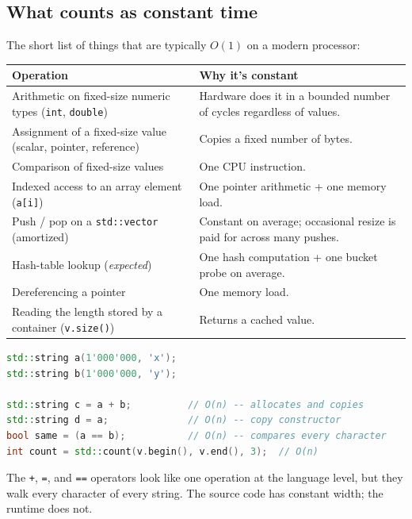 \documentclass[11pt]{article}
\begin{document}
\subsection{What counts as constant time}

The short list of things that are typically $O(1)$ on a modern
processor:

\begin{center}
\footnotesize
\renewcommand{\arraystretch}{1.3}
\begin{tabular}{@{}p{6cm}p{6.8cm}@{}}
\hline
\textbf{Operation} & \textbf{Why it's constant} \\
\hline
Arithmetic on fixed-size numeric types (\texttt{int}, \texttt{double}) & Hardware does it in a bounded number of cycles regardless of values. \\
Assignment of a fixed-size value (scalar, pointer, reference) & Copies a fixed number of bytes. \\
Comparison of fixed-size values                            & One CPU instruction. \\
Indexed access to an array element (\texttt{a[i]})         & One pointer arithmetic + one memory load. \\
Push / pop on a \texttt{std::vector} (amortized)           & Constant on average; occasional resize is paid for across many pushes. \\
Hash-table lookup (\emph{expected})                        & One hash computation + one bucket probe on average. \\
Dereferencing a pointer                                    & One memory load. \\
Reading the length stored by a container (\texttt{v.size()}) & Returns a cached value. \\
\hline
\end{tabular}
\end{center}

\begin{examplebox}
\begin{lstlisting}[basicstyle=\ttfamily\small,frame=single,language=C++]
std::string a(1'000'000, 'x');
std::string b(1'000'000, 'y');

std::string c = a + b;          // O(n) -- allocates and copies
std::string d = a;              // O(n) -- copy constructor
bool same = (a == b);           // O(n) -- compares every character
int count = std::count(v.begin(), v.end(), 3);  // O(n)
\end{lstlisting}
The \texttt{+}, \texttt{=}, and \texttt{==} operators look like one
operation at the language level, but they walk every character of
every string. The source code has constant width; the runtime does
not.
\end{examplebox}
\end{document}

